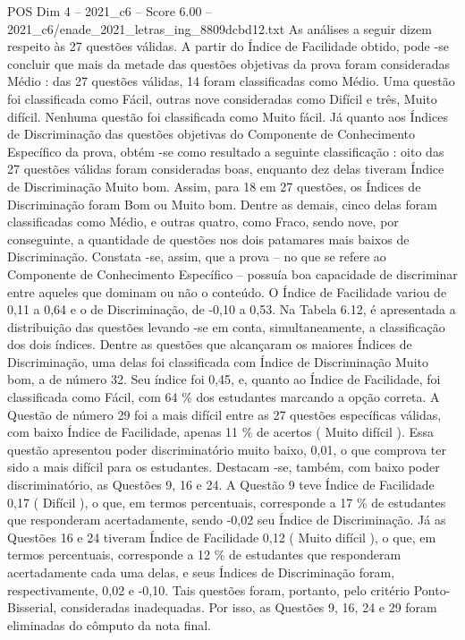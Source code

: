 \begin{textsample}{POS Dim 4 – 2021\_c6 – Score 6.00 – 2021\_c6/enade\_2021\_letras\_ing\_8809dcbd12.txt}
As análises a seguir dizem respeito às 27 questões válidas.
A partir do Índice de Facilidade obtido, pode -se concluir que mais da metade das questões objetivas da prova foram consideradas Médio : das 27 questões válidas, 14 foram classificadas como Médio.
Uma questão foi classificada como Fácil, outras nove consideradas como Difícil e três, Muito difícil.
Nenhuma questão foi classificada como Muito fácil.
Já quanto aos Índices de Discriminação das questões objetivas do Componente de Conhecimento Específico da prova, obtém -se como resultado a seguinte classificação : oito das 27 questões válidas foram consideradas boas, enquanto dez delas tiveram Índice de Discriminação Muito bom.
Assim, para 18 em 27 questões, os Índices de Discriminação foram Bom ou Muito bom.
Dentre as demais, cinco delas foram classificadas como Médio, e outras quatro, como Fraco, sendo nove, por conseguinte, a quantidade de questões nos dois patamares mais baixos de Discriminação.
Constata -se, assim, que a prova – no que se refere ao Componente de Conhecimento Específico – possuía boa capacidade de discriminar entre aqueles que dominam ou não o conteúdo.
O Índice de Facilidade variou de 0,11 a 0,64 e o de Discriminação, de -0,10 a 0,53.
Na Tabela 6.12, é apresentada a distribuição das questões levando -se em conta, simultaneamente, a classificação dos dois índices.
Dentre as questões que alcançaram os maiores Índices de Discriminação, uma delas foi classificada com Índice de Discriminação Muito bom, a de número 32.
Seu índice foi 0,45, e, quanto ao Índice de Facilidade, foi classificada como Fácil, com 64 \% dos estudantes marcando a opção correta.
A Questão de número 29 foi a mais difícil entre as 27 questões específicas válidas, com baixo Índice de Facilidade, apenas 11 \% de acertos ( Muito difícil ).
Essa questão apresentou poder discriminatório muito baixo, 0,01, o que comprova ter sido a mais difícil para os estudantes.
Destacam -se, também, com baixo poder discriminatório, as Questões 9, 16 e 24.
A Questão 9 teve Índice de Facilidade 0,17 ( Difícil ), o que, em termos percentuais, corresponde a 17 \% de estudantes que responderam acertadamente, sendo -0,02 seu Índice de Discriminação.
Já as Questões 16 e 24 tiveram Índice de Facilidade 0,12 ( Muito difícil ), o que, em termos percentuais, corresponde a 12 \% de estudantes que responderam acertadamente cada uma delas, e seus Índices de Discriminação foram, respectivamente, 0,02 e -0,10.
Tais questões foram, portanto, pelo critério Ponto-Bisserial, consideradas inadequadas.
Por isso, as Questões 9, 16, 24 e 29 foram eliminadas do cômputo da nota final.

\end{textsample}

